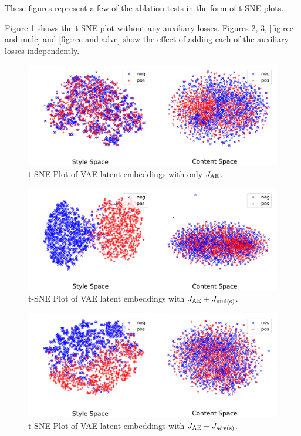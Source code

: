 \documentclass[letterpaper]{article}
\begin{document}
These figures represent a few of the ablation tests in the form of t-SNE plots.

Figure \ref{fig:only-rec} shows the t-SNE plot without any auxiliary losses.
Figures \ref{fig:rec-and-muls}, \ref{fig:rec-and-advs}, \ref{fig:rec-and-mulc} and \ref{fig:rec-and-advc} show the effect of adding each of the auxiliary losses independently.

\begin{figure}[ht]
	\includegraphics[width=\linewidth]{vae-latent-spaces-only-rec}
	\caption{t-SNE Plot of VAE latent embeddings with only $J_{\text{AE}}$.}
	\label{fig:only-rec}
\end{figure}

\begin{figure}[ht]
	\includegraphics[width=\linewidth]{vae-latent-spaces-rec-muls}
	\caption{t-SNE Plot of VAE latent embeddings with $J_{\text{AE}} + J_{\text{mul(s)}}$.}
	\label{fig:rec-and-muls}
\end{figure}

\begin{figure}[ht]
	\includegraphics[width=\linewidth]{vae-latent-spaces-rec-advs}
	\caption{t-SNE Plot of VAE latent embeddings with $J_{\text{AE}} + J_{\text{adv(s)}}$.}
	\label{fig:rec-and-advs}
\end{figure}
\end{document}
